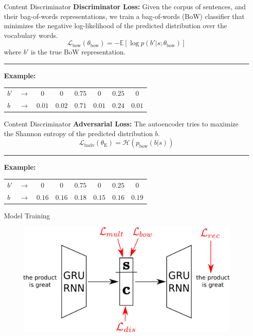 \documentclass[aspectratio=169]{beamer}
\newcommand{\loss}[1]{\mathcal{L}_{\text{#1}}}
\newcommand{\param}[1]{\theta_{\text{#1}}}
\begin{document}
\begin{frame}{Content Discriminator}
	\textbf{Discriminator Loss:}
	Given the corpus of sentences, and their bag-of-words representations, we train a bag-of-words (BoW) classifier that minimizes the negative log-likelihood of the predicted distribution over the vocabulary words.
	\begin{equation*} \label{eqn:bow-disc-loss}
		\loss{bow}(\param{bow}) = - \mathbb{E} [\log p(b'|s;\param{bow})]
	\end{equation*}
	where $b'$ is the true BoW representation.

	\noindent\rule{\textwidth}{0.5pt}

	\centering
	\textbf{Example:}
	\begin{tabular}{ l  c | c | c | c | c | c | c |}
		\cline{3-8}
		$b'$ & $\rightarrow$ & $0$    & $0$    & $0.75$ & $0$    & $0.25$ & $0$    \\
		\cline{3-8}
		$b$  & $\rightarrow$ & $0.01$ & $0.02$ & $0.71$ & $0.01$ & $0.24$ & $0.01$ \\
		\cline{3-8}
	\end{tabular}
\end{frame}

\begin{frame}{Content Discriminator}
	\textbf{Adversarial Loss:}
	The autoencoder tries to maximize the Shannon entropy of the predicted distribution $b$.
	\begin{equation*}
		\loss{badv}(\param{E}) = \mathcal{H}(p_\text{bow}(b|s))
	\end{equation*}

	\noindent\rule{\textwidth}{0.5pt}

	\centering
	\textbf{Example:}
	\begin{tabular}{ l  c | c | c | c | c | c | c |}
		\cline{3-8}
		$b'$ & $\rightarrow$ & $0$    & $0$    & $0.75$ & $0$    & $0.25$ & $0$    \\
		\cline{3-8}
		$b$  & $\rightarrow$ & $0.16$ & $0.16$ & $0.18$ & $0.15$ & $0.16$ & $0.19$ \\
		\cline{3-8}
	\end{tabular}
\end{frame}

\begin{frame}{Model Training}
	\centering
	\begin{figure}[ht]
		\includegraphics[width=\textwidth]{images/overview-training-all}
	\end{figure}
\end{frame}
\end{document}
